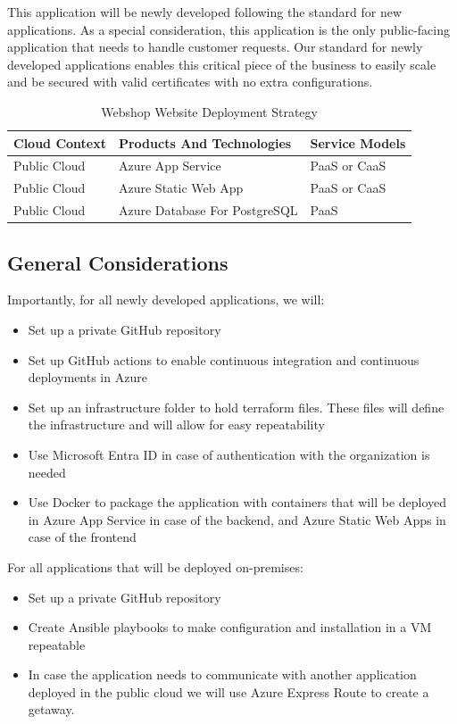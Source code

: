 \documentclass{llncs}
\begin{document}
This application will be newly developed following the standard for new applications.
As a special consideration, this application is the only public-facing application that needs to handle customer requests.
Our standard for newly developed applications enables this critical piece of the business to easily scale and be secured with valid certificates with no extra configurations.\\

\begin{table}[h!]
    \centering
    \begin{tabular}{lll}
        \hline
        \textbf{Cloud Context} & \textbf{Products And Technologies} & \textbf{Service Models} \\
        \hline
        Public Cloud           & Azure App Service                  & PaaS or CaaS            \\
        \hline
        Public Cloud           & Azure Static Web App               & PaaS or CaaS            \\
        \hline
        Public Cloud           & Azure Database For PostgreSQL      & PaaS                    \\
        \hline
    \end{tabular}
    \caption{Webshop Website Deployment Strategy}
\end{table}

\subsection{General Considerations}

Importantly, for all newly developed applications, we will:
\begin{itemize}
    \item Set up a private GitHub repository
    \item Set up GitHub actions to enable continuous integration and continuous deployments in Azure
    \item Set up an infrastructure folder to hold terraform files. These files will define the infrastructure and will allow for easy repeatability
    \item Use Microsoft Entra ID in case of authentication with the organization is needed
    \item Use Docker to package the application with containers that will be deployed in Azure App Service in case of the backend, and Azure Static Web Apps in case of the frontend
\end{itemize}
For all applications that will be deployed on-premises:
\begin{itemize}
    \item Set up a private GitHub repository
    \item Create Ansible playbooks to make configuration and installation in a VM repeatable
    \item In case the application needs to communicate with another application deployed in the public cloud we will use Azure Express Route to create a getaway.
\end{itemize}
\end{document}

